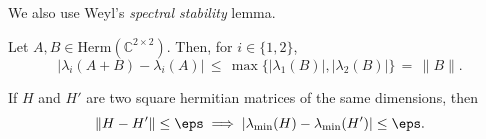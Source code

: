 \noindent We also use Weyl's \emph{spectral stability} lemma.
\begin{lemma}\label{lem:spectral-stab}
Let $A,B \in \mathrm{Herm}(\mathbb{C}^{2 \times 2})$. Then, for $i \in \{1,2\}$,
$$
\left|\lambda_i(A+B) - \lambda_i(A) \right| \, \leq \, \max \{|\lambda_1(B)|, |\lambda_2(B)|\} \, = \, \|B\|.
$$
\end{lemma}

\begin{fact}
If $H$ and $H'$ are two square hermitian matrices of the same dimensions, then 
\begin{equation}
    \|H - H'\| \leq \eps \implies |\lambda_{\mathrm{min}}(H) -\lambda_{\mathrm{min}}(H')| \leq \eps.
\end{equation}
\end{fact}
